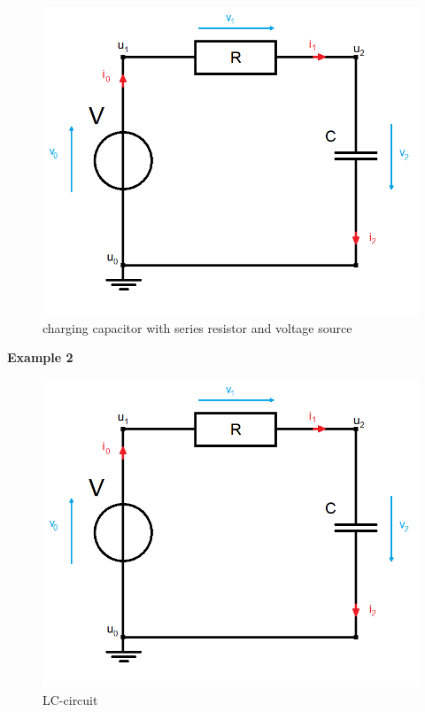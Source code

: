 	\begin{figure}[H]
		\centering
		\includegraphics[scale=0.4]{pictures/Example1_simple_p2.png}
		\caption{charging capacitor with series resistor and voltage source}
	\end{figure}

	\textbf{Example 2} \\
	
	\begin{figure}[H]
		\centering
		\includegraphics[scale=0.4]{pictures/Example1_simple_p2.png}
		\caption{LC-circuit}
	\end{figure}